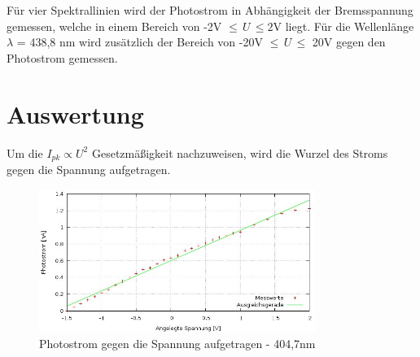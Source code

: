 Für vier Spektrallinien wird der Photostrom in Abhängigkeit der Bremsspannung gemessen, welche in einem Bereich von -2V $\leq \,U \, \leq 2$V
liegt. Für die Wellenlänge $\lambda$ = 438,8 nm wird zusätzlich der Bereich von -20V $\leq \,U \, \leq$ 20V gegen den Photostrom gemessen.


\section{Auswertung}
Um die $I_{pk} \propto U^2$
Gesetzmäßigkeit nachzuweisen, wird die Wurzel des Stroms gegen die Spannung aufgetragen.

\begin{figure}[H]
\includegraphics[width=0.8\textwidth]{pics/wurzel404.jpg}
\caption{Photostrom gegen die Spannung aufgetragen - 404,7nm}
\end{figure}


